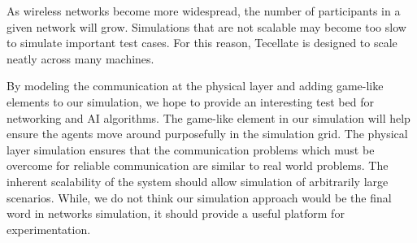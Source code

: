 \documentclass[12pt]{article}
\begin{document}
As wireless networks become more widespread, the number of participants in a given network will
grow. Simulations that are not scalable may become too slow to simulate important test cases. For
this reason, Tecellate is designed to scale neatly across many machines.

By modeling the communication at the physical layer and adding game-like elements to our simulation,
we hope to provide an interesting test bed for networking and AI algorithms. The game-like element
in our simulation will help ensure the agents move around purposefully in the simulation grid. The
physical layer simulation ensures that the communication problems which must be overcome for
reliable communication are similar to real world problems. The inherent scalability of the system
should allow simulation of arbitrarily large scenarios. While, we do not think our simulation
approach would be the final word in networks simulation, it should provide a useful platform for
experimentation.













\nocite{*}


\end{document}
